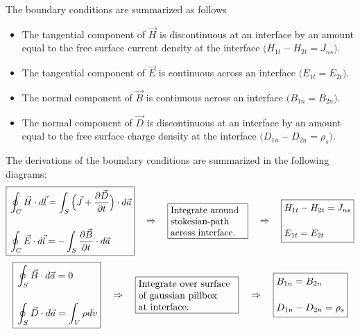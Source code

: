 \documentclass[12pt,a4paper,oneside]{book}
\begin{document}
\begin{onehalfspace}
The boundary conditions are summarized as follows
\begin{itemize}
	\item The tangential component of $\vec{H}$ is discontinuous at an interface by an amount equal to the free surface current density at the interface $\big(H_{1t}-H_{2t} = J_{ns}\big)$.
	\item The tangential component of $\vec{E}$ is continuous across an interface $\big(E_{1t}=E_{2t}\big)$.
	\item The normal component of $\vec{B}$ is continuous across an interface $\big(B_{1n}=B_{2n}\big)$.
	\item The normal component of $\vec{D}$ is discontinuous at an interface by an amount equal to the free surface charge density at the interface $\big(D_{1n}-D_{2n}=\rho_{s}\big)$.
\end{itemize}  
The derivations of the boundary conditions are summarized in the following diagrams:
\begin{equation*}
\boxed{\begin{aligned}
	&\oint_C\vec{H}\cdot d\vec{l}=\int_S\Big(\vec{J} + \frac{\partial \vec{D}}{\partial t}\Big)\cdot d\vec{a} \\[12pt]
	&\oint_{C}\vec{E}\cdot d\vec{l}=-\int_{S}\frac{\partial \vec{B}}{\partial t}\cdot d\vec{a}
\end{aligned}} \quad\Rightarrow\quad\boxed{\parbox[c]{8em}{Integrate around \\stokesian-path \\across interface.}}\quad\Rightarrow\quad
\boxed{\begin{aligned}
		&H_{1t}-H_{2t} = J_{ns} \\[12pt]
		&E_{1t}=E_{2t}
\end{aligned}}
\end{equation*}
\begin{equation*}
	\boxed{\begin{aligned}
			&\oint_{S}\vec{B}\cdot d\vec{a}=0 \\[12pt]
			&\oint_{S}\vec{D}\cdot d\vec{a}=\int_{V}\rho dv
	\end{aligned}} \quad\Rightarrow\quad\boxed{\parbox[c]{10em}{Integrate over surface \\ of gaussian pillbox \\at interface.}}\quad\Rightarrow\quad
	\boxed{\begin{aligned}
			&B_{1n}=B_{2n} \\[12pt]
			&D_{1n}-D_{2n} = \rho_{s}
	\end{aligned}}
\end{equation*}

\end{onehalfspace}
\end{document}
